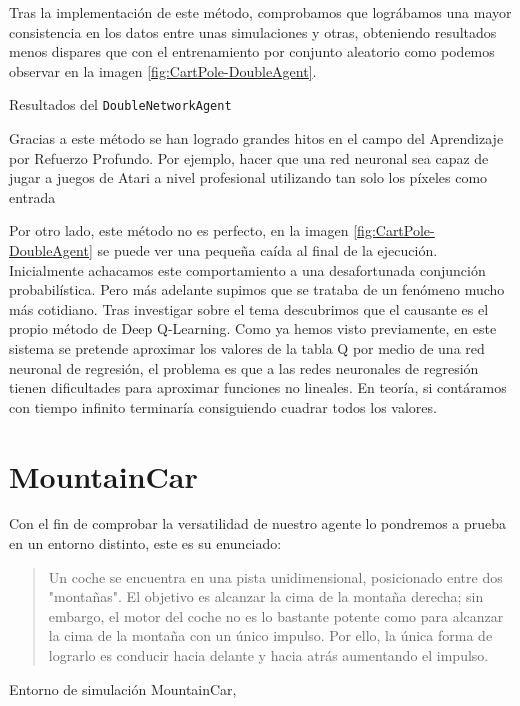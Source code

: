 Tras la implementación de este método, comprobamos que lográbamos una mayor consistencia en los datos entre unas simulaciones y otras, obteniendo resultados menos dispares que con el entrenamiento por conjunto aleatorio como podemos observar en la imagen \ref{fig:CartPole-DoubleAgent}.

%
       {Resultados del \texttt{DoubleNetworkAgent}}

Gracias a este método se han logrado grandes hitos en el campo del Aprendizaje por Refuerzo Profundo. Por ejemplo, hacer que una red neuronal sea capaz de jugar a juegos de Atari a nivel profesional utilizando tan solo los píxeles como entrada \citep{mnih2013playing}

Por otro lado, este método no es perfecto, en la imagen \ref{fig:CartPole-DoubleAgent} se puede ver una pequeña caída al final de la ejecución. Inicialmente achacamos este comportamiento a una desafortunada conjunción probabilística. Pero más adelante supimos que se trataba de un fenómeno mucho más cotidiano. Tras investigar sobre el tema descubrimos que el causante es el propio método de Deep Q-Learning. Como ya hemos visto previamente, en este sistema se pretende aproximar los valores de la tabla Q por medio de una red neuronal de regresión, el problema es que a las redes neuronales de regresión tienen dificultades para aproximar funciones no lineales. En teoría, si contáramos con tiempo infinito terminaría consiguiendo cuadrar todos los valores.

\section{MountainCar}

Con el fin de comprobar la versatilidad de nuestro agente lo pondremos a prueba en un entorno distinto, este es su enunciado:

\begin{quote}
    Un coche se encuentra en una pista unidimensional, posicionado entre dos "montañas". El objetivo es alcanzar la cima de la montaña derecha; sin embargo, el motor del coche no es lo bastante potente como para alcanzar la cima de la montaña con un único impulso. Por ello, la única forma de lograrlo es conducir hacia delante y hacia atrás aumentando el impulso.
\end{quote}

%
       {Entorno de simulación MountainCar, \citet{brockman2016openai}}

